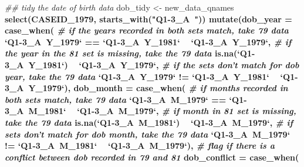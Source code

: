 \documentclass{article}
\newenvironment{Shaded}{\begin{snugshade}}{\end{snugshade}}
\newcommand{\CommentTok}[1]{\textcolor[rgb]{0.56,0.35,0.01}{\textit{#1}}}
\newcommand{\DataTypeTok}[1]{\textcolor[rgb]{0.13,0.29,0.53}{#1}}
\newcommand{\DecValTok}[1]{\textcolor[rgb]{0.00,0.00,0.81}{#1}}
\newcommand{\KeywordTok}[1]{\textcolor[rgb]{0.13,0.29,0.53}{\textbf{#1}}}
\newcommand{\NormalTok}[1]{#1}
\newcommand{\OperatorTok}[1]{\textcolor[rgb]{0.81,0.36,0.00}{\textbf{#1}}}
\newcommand{\StringTok}[1]{\textcolor[rgb]{0.31,0.60,0.02}{#1}}
\begin{document}
\begin{Shaded}
\begin{Highlighting}[]
\CommentTok{## tidy the date of birth data}
\NormalTok{dob_tidy <-}\StringTok{ }\NormalTok{new_data_qnames }\OperatorTok{%>%}
\StringTok{  }\KeywordTok{select}\NormalTok{(CASEID_}\DecValTok{1979}\NormalTok{,}
         \KeywordTok{starts_with}\NormalTok{(}\StringTok{"Q1-3_A~"}\NormalTok{)) }\OperatorTok{%>%}
\StringTok{  }\KeywordTok{mutate}\NormalTok{(}\DataTypeTok{dob_year =} \KeywordTok{case_when}\NormalTok{(}
                    \CommentTok{# if the years recorded in both sets match, take 79 data}
                    \StringTok{`}\DataTypeTok{Q1-3_A~Y_1979}\StringTok{`} \OperatorTok{==}\StringTok{ `}\DataTypeTok{Q1-3_A~Y_1981}\StringTok{`} \OperatorTok{~}\StringTok{ `}\DataTypeTok{Q1-3_A~Y_1979}\StringTok{`}\NormalTok{,}
                    \CommentTok{# if the year in the 81 set is missing, take the 79 data}
                    \KeywordTok{is.na}\NormalTok{(}\StringTok{`}\DataTypeTok{Q1-3_A~Y_1981}\StringTok{`}\NormalTok{) }\OperatorTok{~}\StringTok{ `}\DataTypeTok{Q1-3_A~Y_1979}\StringTok{`}\NormalTok{,}
                    \CommentTok{# if the sets don't match for dob year, take the 79 data}
                    \StringTok{`}\DataTypeTok{Q1-3_A~Y_1979}\StringTok{`} \OperatorTok{!=}\StringTok{ `}\DataTypeTok{Q1-3_A~Y_1981}\StringTok{`} \OperatorTok{~}\StringTok{ `}\DataTypeTok{Q1-3_A~Y_1979}\StringTok{`}\NormalTok{),}
        \DataTypeTok{dob_month =} \KeywordTok{case_when}\NormalTok{(}
                    \CommentTok{# if months recorded in both sets match, take 79 data}
                    \StringTok{`}\DataTypeTok{Q1-3_A~M_1979}\StringTok{`} \OperatorTok{==}\StringTok{ `}\DataTypeTok{Q1-3_A~M_1981}\StringTok{`} \OperatorTok{~}\StringTok{ `}\DataTypeTok{Q1-3_A~M_1979}\StringTok{`}\NormalTok{,}
                    \CommentTok{# if month in 81 set is missing, take the 79 data}
                    \KeywordTok{is.na}\NormalTok{(}\StringTok{`}\DataTypeTok{Q1-3_A~M_1981}\StringTok{`}\NormalTok{) }\OperatorTok{~}\StringTok{ `}\DataTypeTok{Q1-3_A~M_1979}\StringTok{`}\NormalTok{,}
                    \CommentTok{# if sets don't match for dob month, take the 79 data}
                    \StringTok{`}\DataTypeTok{Q1-3_A~M_1979}\StringTok{`} \OperatorTok{!=}\StringTok{ `}\DataTypeTok{Q1-3_A~M_1981}\StringTok{`} \OperatorTok{~}\StringTok{ `}\DataTypeTok{Q1-3_A~M_1979}\StringTok{`}\NormalTok{),}
        \CommentTok{# flag if there is a conflict between dob recorded in 79 and 81}
        \DataTypeTok{dob_conflict =} \KeywordTok{case_when}\NormalTok{(     }
}}
\end{Highlighting}
\end{Shaded}
\end{document}
